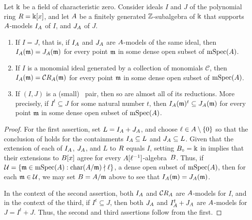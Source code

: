 \documentclass{article}
\begin{document}
\begin{corollary}
\label{reduction basics: C}
Let $\Bbbk$ be a field of characteristic zero.  Consider ideals  $I$ and $J$ of the polynomial ring $R = \Bbbk[x]$, and let $A$ be a finitely generated $\mathbb{Z}$-subalgebra of $\Bbbk$ that supports $A$-models $I_A$ of $I$, and $J_A$ of $J$.   

\begin{enumerate}[$(1)$]
\item \label{different models of same ideal}
If $I=J$, that is, if $I_A$ and $J_A$ are $A$-models of the same ideal, then $I_A(\mathfrak{m}) = J_A(\mathfrak{m})$ for every point $\mathfrak{m}$ in some dense open subset of $\operatorname{mSpec}(A)$.
\item \label{reduction preserves being monomial} If $I$ is a monomial ideal generated by a collection of monomials $\mathcal{C}$, then $I_A(\mathfrak{m}) = \mathcal{C} R_A(\mathfrak{m})$ for every point $\mathfrak{m}$ in some dense open subset of $\operatorname{mSpec}(A)$.
\item \label{reduction preserves compatibility} If $(I,J)$ is a \textup(small\textup) \compatible\ pair, then so are almost all of its reductions.  More precisely, if $I^t \subseteq J$ for some natural number $t$, then $I_A(\mathfrak{m})^t \subseteq J_A(\mathfrak{m})$ for every point $\mathfrak{m}$ in some dense open subset of $\operatorname{mSpec}(A)$.
\end{enumerate}
\end{corollary}

\begin{proof}
   For the first assertion, set $L=I_A + J_A$, and choose $\ell \in A \setminus \{0\}$ so that the conclusion of  holds for the containments $I_A \subseteq L$ and $J_A \subseteq L$.
   Given that the extension of each of $I_A$, $J_A$, and $L$ to $R$ equals $I$, setting $B_{\circ} = \Bbbk$ in  implies that their extensions to $B[x]$ agree for every $A[\ell^{-1}]$-algebra~$B$.
   Thus, if $\mathcal{U} = \{ \mathfrak{m} \in \operatorname{mSpec}(A) : \operatorname{char}(A/\mathfrak{m}) \nmid \ell \}$,  a dense open subset of $\operatorname{mSpec}(A)$, 
 then for each $\mathfrak{m} \in \mathcal{U}$, we may set $B=A/\mathfrak{m}$ above to see that $I_A(\mathfrak{m}) = J_A(\mathfrak{m})$.

 In the context of the second assertion, both $I_A$ and $\mathcal{C}R_A$ are $A$-models for $I$, and in the context of the third, if $I^t \subseteq J$, then both $J_A$ and $I_A^t +J_A$ are $A$-models for $J=I^t + J$.
 Thus, the second and third assertions follow from the first. 
\end{proof}
\end{document}
